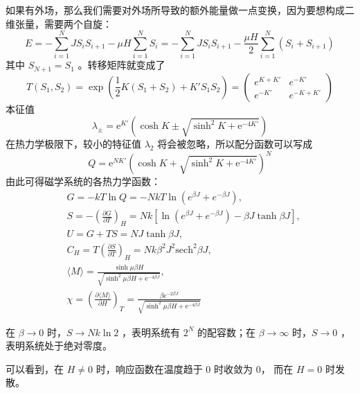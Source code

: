 如果有外场，那么我们需要对外场所导致的额外能量做一点变换，因为要想构成二维张量，需要两个自旋：
\[
    E = -\sum_{i=1}^N JS_i S_{i+1} - \mu H\sum_{i=1}^N S_i = -\sum_{i=1}^N JS_i S_{i+1} - \frac{\mu H}{2} \sum_{i=1}^N (S_i + S_{i+1})
\]
其中 $S_{N+1} = S_1$ 。转移矩阵就变成了
\begin{equation}
    T(S_1,S_2) = \exp(\frac{1}{2}K (S_1+S_2) + K' S_1 S_{2}) = \begin{pmatrix}
        e^{K+K'} & e^{-K'} \\
        e^{-K'} & e^{-K+K'}
    \end{pmatrix} 
\end{equation}
本征值
\begin{equation}
    \lambda_\pm = \mathrm{e}^{ K'}\left(\cosh K \pm \sqrt{\sinh ^2 K + \mathrm{e}^{-4 K'}}\right)
\end{equation}
在热力学极限下，较小的特征值 $\lambda_2$ 将会被忽略，所以配分函数可以写成
\begin{equation}
    Q=\mathrm{e}^{N K'}\left(\cosh K+\sqrt{\sinh ^2 K+\mathrm{e}^{-4 K'}}\right)^N
\end{equation}
由此可得磁学系统的各热力学函数：
\begin{align*}
    &G = -kT\ln Q = -NkT \ln (e^{\beta J} + e^{-\beta J}), \\
    &S = -\left(\frac{\partial G}{\partial T}\right)_{H} = Nk\left[\ln (e^{\beta J} + e^{-\beta J}) - \beta J \tanh\beta J\right],\\
    &U = G + TS =  NJ \tanh\beta J,\\
    &C_H = T\left(\frac{\partial S}{\partial T}\right)_H = Nk\beta^2 J^2 \mathrm{sech}^2 \beta J,\\
    &\langle M \rangle = \frac{\sinh \mu \beta H}{\sqrt{\sinh ^2 \mu \beta H+\mathrm{e}^{-4 \beta J}}},\\
    &\chi = \left(\frac{\partial \langle M \rangle}{\partial H}\right)_T = \frac{\beta \mathrm{e}^{-2 \beta J}}{\sqrt{\sinh ^2 \mu \beta H+\mathrm{e}^{-4 \beta J}}}
\end{align*}

在 $\beta \rightarrow 0$ 时，$S \rightarrow Nk\ln 2$ ，表明系统有 $2^N$ 的配容数；在 $\beta \rightarrow \infty$ 时，$S \rightarrow 0$ ，表明系统处于绝对零度。
 
可以看到，在 $H \neq 0$ 时，响应函数在温度趋于 $0$ 时收敛为 $0$， 而在 $H = 0$ 时发散。

